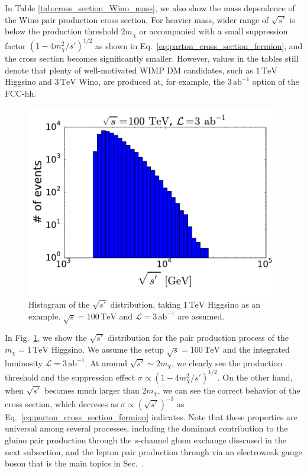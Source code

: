 \documentclass[12pt,twoside,book]{article}
\begin{document}
In Table \ref{tab:cross_section_Wino_mass}, we also show the mass dependence of the Wino pair production cross section.
For heavier mass, wider range of $\sqrt{s'}$ is below the production threshold $2 m_{\chi}$ or accompanied with a small suppression factor $(1-4 m_\chi^2 / s')^{1/2}$ as shown in Eq.~\eqref{eq:parton_cross_section_fermion}, and the cross section becomes significantly smaller.
However, values in the tables still denote that plenty of well-motivated WIMP DM candidates, such as $1\,\mathrm{TeV}$ Higgsino and $3\,\mathrm{TeV}$ Wino, are produced at, for example, the $3\,\mathrm{ab}^{-1}$ option of the FCC-hh.

\begin{figure}[t]
  \centering
  \includegraphics[width=0.5\hsize]{invariant_mass.pdf}
  \caption{
    Histogram of the $\sqrt{s'}$ distribution, taking $1\,\mathrm{TeV}$ Higgsino as an example.
    $\sqrt{s} = 100\,\mathrm{TeV}$ and $\mathcal{L} = 3\,\mathrm{ab}^{-1}$ are assumed.}
  \label{fig:invariant_mass}
\end{figure}

In Fig.~\ref{fig:invariant_mass}, we show the $\sqrt{s'}$ distribution for the pair production process of the $m_\chi = 1\,\mathrm{TeV}$ Higgsino.
We assume the setup $\sqrt{s} = 100\,\mathrm{TeV}$ and the integrated luminosity $\mathcal{L} = 3\,\mathrm{ab}^{-1}$.
At around $\sqrt{s'} \sim 2 m_\chi$, we clearly see the production threshold and the suppression effect $\sigma \propto (1-4 m_\chi^2 / s')^{1/2}$.
On the other hand, when $\sqrt{s'}$ becomes much larger than $2m_\chi$, we can see the correct behavior of the cross section, which decreses as $\sigma \propto (\sqrt{s'})^{-3}$ as Eq.~\eqref{eq:parton_cross_section_fermion} indicates.
Note that these properties are universal among several processes, including the dominant contribution  to the gluino pair production through the $s$-channel gluon exchange disscused in the next subsection, and the lepton pair production through via an electroweak gauge boson that is the main topics in Sec.~.
\end{document}
